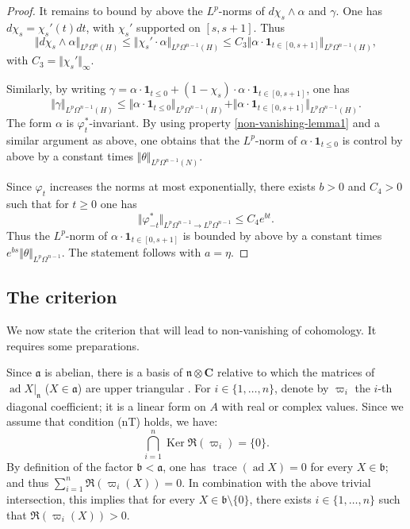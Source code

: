 \documentclass[JEP,XML,SOM,Unicode,published]{cedram}
\newcommand{\fra}{\mathfrak{a}}
\newcommand{\frb}{\mathfrak{b}}
\newcommand{\frn}{\mathfrak{n}}
\newcommand{\CC}{\mathbf{C}}
\theoremstyle{plain}
\theoremstyle{remark}
\theoremstyle{definition}
\DeclareMathOperator{\ad}{ad}
\DeclareMathOperator{\Ker}{Ker}
\DeclareMathOperator{\trace}{trace}
\newcommand{\restr}{\big|}
\begin{document}
\begin{proof}
It remains to bound by above the $L^p$\nobreakdash-norms of $d\chi_s \wedge \alpha$ and $\gamma$.
One has $d \chi_s = \chi_s'(t)dt$, with $\chi_s'$ supported on $[s,s+1]$. Thus
\[\Vert d\chi_s \wedge \alpha \Vert_{L^p \Omega^n (H)} \leqslant \Vert \chi_s' \cdot \alpha \Vert_{L^p \Omega^{n-1} (H)}
\leqslant C_3 \Vert \alpha \cdot \mathbf{1}_{t\in [0,s+1]}\Vert_{L^p \Omega^{n-1} (H)},\]
with $C_3 = \Vert \chi_s' \Vert_\infty$.

Similarly, by writing
$\gamma = \alpha \cdot \mathbf 1_{t \leqslant 0} + (1- \chi_s) \cdot \alpha \cdot \mathbf 1_{t \in [0, s+1]}$,
one has
\[\Vert \gamma \Vert_{L^p \Omega^{n-1} (H)} \leqslant \Vert \alpha \cdot \mathbf{1}_{t \leqslant 0}\Vert_{L^p \Omega^{n-1} (H)}
+ \Vert \alpha \cdot \mathbf{1}_{t\in [0,s+1]}\Vert_{L^p \Omega^{n-1} (H)}.\]
The form $\alpha$ is $\varphi_t^*$-invariant. By using property \eqref{non-vanishing-lemma1} and a similar argument as above, one obtains that the $L^p$\nobreakdash-norm of $\alpha \cdot \mathbf 1_{t \leqslant 0}$ is control by above by a constant times
$\Vert \theta \Vert_{L^p \Omega^{n-1}(N)}$.

Since $\varphi_t$ increases the norms at most exponentially, there exists $b >0$ and $C_4 >0$ such that for $t\geqslant 0$ one has
\[\Vert \varphi_{-t}^* \Vert_{L^p \Omega^{n-1} \to L^p \Omega^{n-1}} \leqslant C_4 e^{b t}.\]
Thus the $L^p$\nobreakdash-norm of $\alpha \cdot \mathbf 1_{t \in [0, s+1]}$ is bounded by above by a constant times
$e^{b s} \Vert \theta \Vert_{L^p \Omega^{n-1}}$.
The statement follows with $a = \eta$.
\end{proof}

\subsection{The criterion}
\label{ss - criterium}
We now state the criterion that will lead to non-vanishing of cohomology.
It requires some preparations.

Since $\fra$ is abelian,
there is a basis of $\frn \otimes \CC$ relative to which
the matrices of $\ad X \restr_\frn$ ($X \in \fra$) are upper triangular \cite[4.1.\,Cor.\,A]{Humphreys-LA}.
For $i \in \{1, \dots , n\}$, denote by $\varpi_i$ the $i$-th diagonal coefficient; it is a linear form on $A$ with real or complex values.
Since we assume that condition (nT) holds, we have:
\[\bigcap_{i =1}^n \Ker \Re (\varpi_i) = \{0\}.\]
By definition of the factor $\frb < \fra$, one has $\trace(\ad X) =0$ for every $X \in \frb$;
and thus $\sum_{i=1}^n \Re (\varpi_i (X)) =0$.
In combination with the above trivial intersection, this implies that for every $X \in \frb \setminus \{0\}$,
there exists $i \in \{1, \dots , n\}$
such that $\Re (\varpi_i (X)) >0$.
\end{document}
